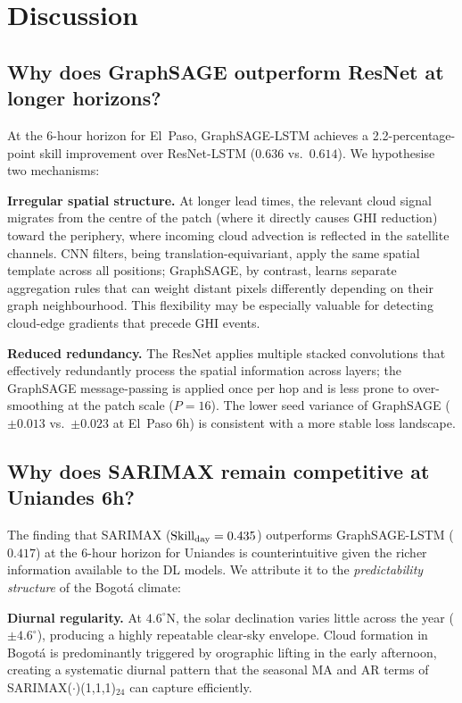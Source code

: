\section{Discussion}
\label{sec:discussion}

\subsection{Why does GraphSAGE outperform ResNet at longer horizons?}

At the 6-hour horizon for El~Paso, GraphSAGE-LSTM achieves a 2.2-percentage-point
skill improvement over ResNet-LSTM ($0.636$ vs.\ $0.614$). We hypothesise two
mechanisms:

\textbf{Irregular spatial structure.} At longer lead times, the relevant cloud
signal migrates from the centre of the patch (where it directly causes GHI
reduction) toward the periphery, where incoming cloud advection is reflected in
the satellite channels. CNN filters, being translation-equivariant, apply the same
spatial template across all positions; GraphSAGE, by contrast, learns separate
aggregation rules that can weight distant pixels differently depending on their
graph neighbourhood. This flexibility may be especially valuable for detecting
cloud-edge gradients that precede GHI events.

\textbf{Reduced redundancy.} The ResNet applies multiple stacked convolutions
that effectively redundantly process the spatial information across layers; the
GraphSAGE message-passing is applied once per hop and is less prone to
over-smoothing at the patch scale ($P = 16$). The lower seed variance of
GraphSAGE ($\pm 0.013$ vs.\ $\pm 0.023$ at El~Paso 6h) is consistent with a
more stable loss landscape.

\subsection{Why does SARIMAX remain competitive at Uniandes 6h?}

The finding that SARIMAX ($\text{Skill}_\text{day} = 0.435$) outperforms GraphSAGE-LSTM ($0.417$)
at the 6-hour horizon for Uniandes is counterintuitive given the richer information
available to the DL models. We attribute it to the \emph{predictability structure}
of the Bogot{\'a} climate:

\textbf{Diurnal regularity.} At $4.6^{\circ}\text{N}$, the solar declination varies little
across the year ($\pm 4.6^{\circ}$), producing a highly repeatable clear-sky envelope.
Cloud formation in Bogot{\'a} is predominantly triggered by orographic lifting in
the early afternoon, creating a systematic diurnal pattern that the seasonal MA
and AR terms of SARIMAX($\cdot$)(1,1,1)$_{24}$ can capture efficiently.

